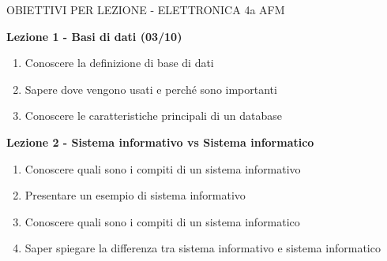 \documentclass{article}
\begin{document}
\begin{center}
\begin{huge}
OBIETTIVI PER LEZIONE - ELETTRONICA 4a AFM
\end{huge}
\end{center}

	\begin{center}
	\end{center}

	\begin{center}
	\textbf{Lezione 1 - Basi di dati (03/10)}
	\begin{enumerate}
	\item Conoscere la definizione di base di dati
	\item Sapere dove vengono usati e perché sono importanti
	\item Conoscere le caratteristiche principali di un database
	\end{enumerate}
	\end{center}
	
	\begin{center}
	\textbf{Lezione 2 - Sistema informativo vs Sistema informatico}
	\begin{enumerate}
	\item Conoscere quali sono i compiti di un sistema informativo
	\item Presentare un esempio di sistema informativo
	\item Conoscere quali sono i compiti di un sistema informatico
	\item Saper spiegare la differenza tra sistema informativo e sistema informatico
	\end{enumerate}
	\end{center}
	
\end{document}
